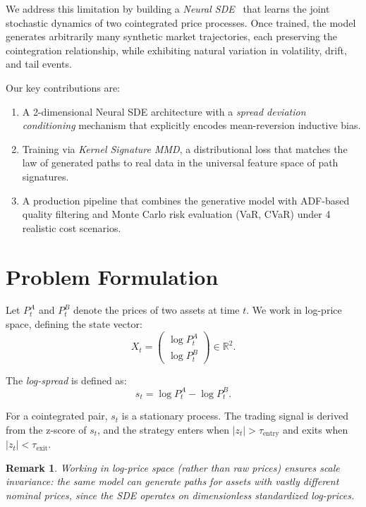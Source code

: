 \documentclass[11pt, a4paper]{article}
\newtheorem{remark}[theorem]{Remark}
\newcommand{\R}{\mathbb{R}}
\newcommand{\logp}{\log P}
\begin{document}
We address this limitation by building a \emph{Neural SDE}~\citep{kidger2021neural} that learns the joint stochastic dynamics of two cointegrated price processes. 
Once trained, the model generates arbitrarily many synthetic market trajectories, each preserving the cointegration relationship, while exhibiting natural variation in volatility, drift, and tail events.

Our key contributions are:
\begin{enumerate}[nosep]
    \item A 2-dimensional Neural SDE architecture with a \emph{spread deviation conditioning} mechanism that explicitly encodes mean-reversion inductive bias.
    \item Training via \emph{Kernel Signature MMD}, a distributional loss that matches the law of generated paths to real data in the universal feature space of path signatures.
    \item A production pipeline that combines the generative model with ADF-based quality filtering and Monte Carlo risk evaluation (VaR, CVaR) under 4 realistic cost scenarios.
\end{enumerate}

\section{Problem Formulation}
\label{sec:problem}

Let $P^A_t$ and $P^B_t$ denote the prices of two assets at time $t$. We work in log-price space, defining the state vector:
\begin{equation}
    X_t = \begin{pmatrix} \logp^A_t \\ \logp^B_t \end{pmatrix} \in \R^2.
\end{equation}

The \emph{log-spread} is defined as:
\begin{equation}
    s_t = \logp^A_t - \logp^B_t.
\end{equation}

For a cointegrated pair, $s_t$ is a stationary process. The trading signal is derived from the z-score of $s_t$, and the strategy enters when $|z_t| > \tau_{\text{entry}}$ and exits when $|z_t| < \tau_{\text{exit}}$.

\begin{remark}
Working in log-price space (rather than raw prices) ensures \emph{scale invariance}: the same model can generate paths for assets with vastly different nominal prices, since the SDE operates on dimensionless standardized log-prices.
\end{remark}
\end{document}

